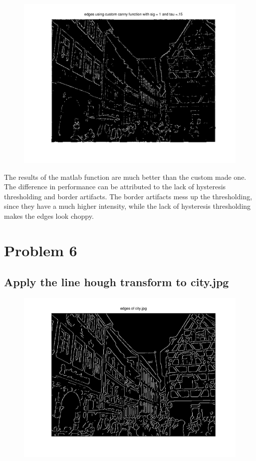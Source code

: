 \documentclass{article}
\begin{document}
	\begin{figure}[H]
		\includegraphics[width=\linewidth]{Q5/partD2.png}
	\end{figure}
	The results of the matlab function are much better than the custom made one. The difference in performance can be attributed to the lack of hysteresis thresholding and border artifacts. The border artifacts mess up the thresholding, since they have a much higher intensity, while the lack of hysteresis thresholding makes the edges look choppy.
	\newpage
	\section{Problem 6}
	\subsection{Apply the line hough transform to city.jpg}
	
	\begin{figure}[H]
		\includegraphics[width=\linewidth]{Q6/partA3.png}
	\end{figure}
	
\end{document}
